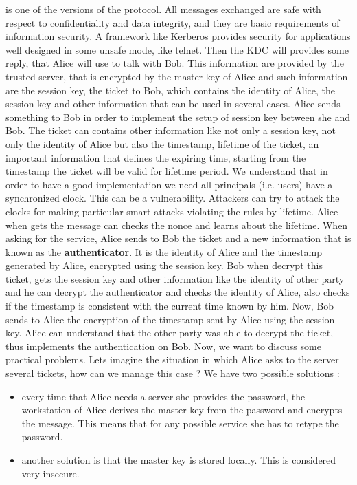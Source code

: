 \documentclass[11pt]{article}
\begin{document}
is one of the versions of the protocol. All messages exchanged are safe with respect to confidentiality and data integrity, and they are basic requirements of information security. A framework like Kerberos provides security for applications well designed in some unsafe mode, like telnet. Then the KDC will provides some reply, that Alice will use to talk with Bob. This information are provided by the trusted server, that is encrypted by the master key of Alice and such information are the session key, the ticket to Bob, which contains the identity of Alice, the session key and other information that can be used in several cases. Alice sends something to Bob in order to implement the setup of session key between she and Bob. The ticket can contains other information like not only a session key, not only the identity of Alice but also the timestamp, lifetime of the ticket, an important information that defines the expiring time, starting from the timestamp the ticket will be valid for lifetime period. We understand that in order to have a good implementation we need all principals (i.e. users) have a synchronized clock. This can be a vulnerability. Attackers can try to attack the clocks for making particular smart attacks violating the rules by lifetime. Alice when gets the message can checks the nonce and learns about the lifetime. When asking for the service, Alice sends to Bob the ticket and a new information that is known as the \textbf{authenticator}. It is the identity of Alice and the timestamp generated by Alice, encrypted using the session key. Bob when decrypt this ticket, gets the session key and other information like the identity of other party and he can decrypt the authenticator and checks the identity of Alice, also checks if the timestamp is consistent with the current time known by him. Now, Bob sends to Alice the encryption of the timestamp sent by Alice using the session key. Alice can understand that the other party was able to decrypt the ticket, thus implements the authentication on Bob. Now, we want to discuss some practical problems. Lets imagine the situation in which Alice asks to the server several tickets, how can we manage this case ? We have two possible solutions :
\begin{itemize}
\item every time that Alice needs a server she provides the password, the workstation of Alice derives the master key from the password and encrypts the message. This means that for any possible service she has to retype the password.
\item another solution is that the master key is stored locally. This is considered
very insecure.
\end{itemize}
\end{document}
